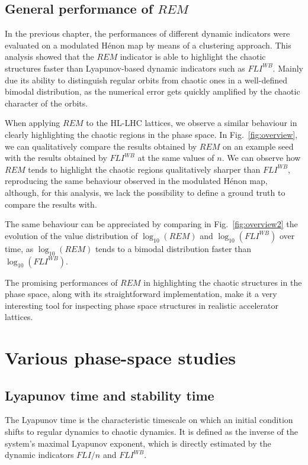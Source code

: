 \subsection{General performance of $REM$}

In the previous chapter, the performances of different dynamic indicators were evaluated on a modulated Hénon map by means of a clustering approach. This analysis showed that the $REM$ indicator is able to highlight the chaotic structures faster than Lyapunov-based dynamic indicators such as $FLI^{WB}$. Mainly due its ability to distinguish regular orbits from chaotic ones in a well-defined bimodal distribution, as the numerical error gets quickly amplified by the chaotic character of the orbits.

When applying $REM$ to the HL-LHC lattices, we observe a similar behaviour in clearly highlighting the chaotic regions in the phase space. In Fig.~\ref{fig:overview}, we can qualitatively compare the results obtained by $REM$ on an example seed with the results obtained by $FLI^{WB}$ at the same values of $n$. We can observe how $REM$ tends to highlight the chaotic regions qualitatively sharper than $FLI^{WB}$, reproducing the same behaviour observed in the modulated Hénon map, although, for this analysis, we lack the possibility to define a ground truth to compare the results with.

The same behaviour can be appreciated by comparing in Fig.~\ref{fig:overview2} the evolution of the value distribution of $\log_{10}(REM)$ and $\log_{10}(FLI^{WB})$ over time, as $\log_{10}(REM)$ tends to a bimodal distribution faster than $\log_{10}(FLI^{WB})$.

The promising performances of $REM$ in highlighting the chaotic structures in the phase space, along with its straightforward implementation, make it a very interesting tool for inspecting phase space structures in realistic accelerator lattices.

\section{Various phase-space studies}

\subsection{Lyapunov time and stability time}

The Lyapunov time is the characteristic timescale on which an initial condition shifts to regular dynamics to chaotic dynamics. It is defined as the inverse of the system's maximal Lyapunov exponent, which is directly estimated by the dynamic indicators $FLI/n$ and $FLI^{{WB}}$.

